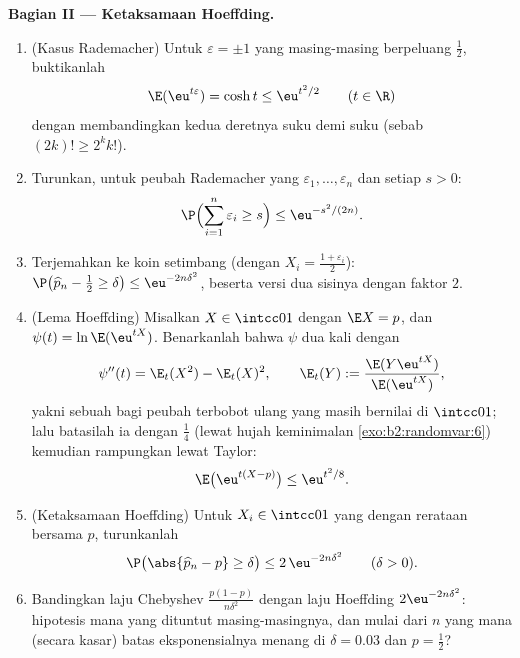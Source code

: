 \begin{problem}
\medskip
\noindent\textbf{Bagian II --- Ketaksamaan Hoeffding.}
\begin{enumerate}[resume]
  \item (Kasus Rademacher) Untuk $\varepsilon = \pm1$ yang masing-masing
        berpeluang $\frac12$, buktikanlah
        \[
        \E(\eu^{t\varepsilon}) = \cosh t \leq \eu^{t^2/2}
        \qquad (t \in \R)
        \]
        dengan membandingkan kedua deretnya suku demi suku (sebab $(2k)! \geq
        2^kk!$).
  \item Turunkan, untuk peubah Rademacher yang 
        $\varepsilon_1, \dots, \varepsilon_n$ dan setiap $s >
        0$:
        \[
        \P\Bigl(\sum_{i=1}^n\varepsilon_i \geq s\Bigr)
        \leq \eu^{-s^2/(2n)} .
        \]
  \item Terjemahkan ke koin setimbang (dengan $X_i =
        \frac{1+\varepsilon_i}2$): $\P\bigl(\widehat p_n -
        \tfrac12 \geq \delta\bigr) \leq \eu^{-2n\delta^2}$,
        beserta versi dua sisinya dengan faktor $2$.
  \item (Lema Hoeffding) Misalkan $X \in \intcc01$ dengan $\E X =
        p$, dan $\psi(t) = \ln\E(\eu^{tX})$. Benarkanlah bahwa
        $\psi$  dua kali dengan
        \[
        \psi''(t) = \E_t(X^2) - \E_t(X)^2, \qquad
        \E_t(Y) := \frac{\E(Y\eu^{tX})}{\E(\eu^{tX})},
        \]
        yakni sebuah \emph{} bagi peubah terbobot ulang yang masih
        bernilai di $\intcc01$; lalu batasilah ia dengan $\frac14$
        (lewat hujah keminimalan \cref{exo:b2:randomvar:6}) kemudian
        rampungkan lewat Taylor:
        \[
        \E\bigl(\eu^{t(X - p)}\bigr) \leq \eu^{t^2/8} .
        \]
  \item (Ketaksamaan Hoeffding) Untuk $X_i \in \intcc01$ yang  dengan rerataan bersama $p$, turunkanlah
        \[
        \P\bigl(\abs{\widehat p_n - p} \geq \delta\bigr)
        \leq 2\,\eu^{-2n\delta^2}
        \qquad (\delta > 0).
        \]
  \item Bandingkan laju Chebyshev
        $\frac{p(1-p)}{n\delta^2}$ dengan laju Hoeffding
        $2\eu^{-2n\delta^2}$: hipotesis mana yang dituntut masing-masingnya,
        dan mulai dari $n$ yang mana (secara kasar) batas
        eksponensialnya menang di $\delta = 0.03$ dan $p =
        \frac12$?
\end{enumerate}


\end{problem}
